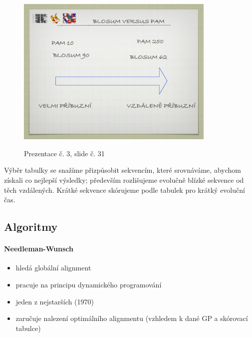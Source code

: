 \documentclass[DIV=8]{scrreprt}
\begin{document}
\begin{figure}
    \caption{Prezentace č. 3, slide č. 31}
    \includegraphics[width=0.85\textwidth]{slides-3/slide-31.jpg}
    \centering
    \label{slides-3-slide-31}
\end{figure}


Výběr tabulky se snažíme přizpůsobit sekvencím, které srovnáváme, abychom získali co nejlepší výsledky; především rozlišujeme evolučně blízké sekvence od těch vzdálených. Krátké sekvence skórujeme podle tabulek pro krátký evoluční čas.

\subsection{Algoritmy} \label{Algoritmy}


\paragraph{Needleman-Wunsch}
\begin{itemize}[nosep]
    \item hledá globální alignment
    \item pracuje na principu dynamického programování
    \item jeden z nejstarších (1970)
    \item zaručuje nalezení optimálního alignmentu (vzhledem k dané GP a skórovací tabulce)
\end{itemize}
\end{document}
